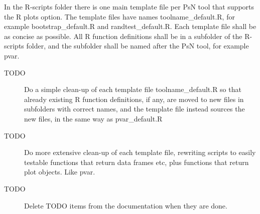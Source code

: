 In the R-scripts folder there is one main template file per PsN tool that supports the R plots option.
The template files have names toolname\_default.R, for example bootstrap\_default.R and randtest\_default.R.
Each template file shall be as concise as possible. All R function definitions shall be in a subfolder of the R-scripts folder, and the subfolder shall be named after the PsN tool, for example pvar.

\begin{description}
\item[TODO]
  Do a simple clean-up of each template file toolname\_default.R so that already existing  R function definitions, if any, are moved
  to new files in subfolders with correct names, and the template file instead sources the new files, in the same way as pvar\_default.R
\item[TODO] Do more extensive clean-up of each template file, rewriting scripts to easily testable functions that return
  data frames etc, plus functions that return plot objects. Like pvar.
\item[TODO] Delete TODO items from the documentation when they are done.
\end{description}



